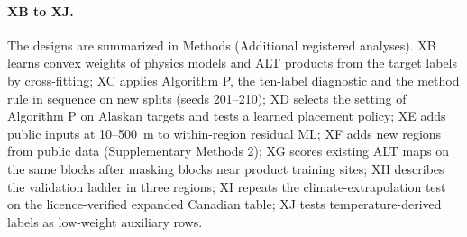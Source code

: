 \paragraph*{XB to XJ.} The designs are summarized in Methods (Additional registered analyses). XB learns convex weights of physics models and ALT products from the target labels by cross-fitting; XC applies Algorithm P, the ten-label diagnostic and the method rule in sequence on new splits (seeds 201--210); XD selects the setting of Algorithm P on Alaskan targets and tests a learned placement policy; XE adds public inputs at 10--500~m to within-region residual ML; XF adds new regions from public data (Supplementary Methods 2); XG scores existing ALT maps on the same blocks after masking blocks near product training sites; XH describes the validation ladder in three regions; XI repeats the climate-extrapolation test on the licence-verified expanded Canadian table; XJ tests temperature-derived labels as low-weight auxiliary rows.

